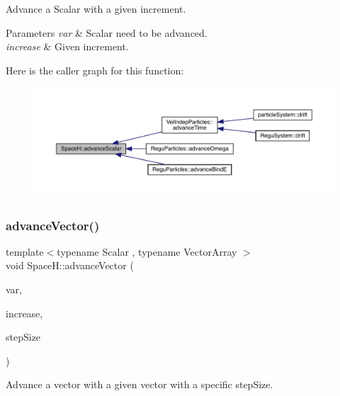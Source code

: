 Advance a Scalar with a given increment. 


\begin{DoxyParams}{Parameters}
{\em var} & Scalar need to be advanced. \\
\hline
{\em increase} & Given increment. \\
\hline
\end{DoxyParams}
Here is the caller graph for this function\+:\nopagebreak
\begin{figure}[H]
\begin{center}
\leavevmode
\includegraphics[width=350pt]{namespace_space_h_a15f1fd0977da382828652627f5dbcdb9_icgraph}
\end{center}
\end{figure}
\mbox{\label{namespace_space_h_a9f1a1d6fedf93c0324cc5993a5694e96}} 
\subsubsection{\texorpdfstring{advance\+Vector()}{advanceVector()}}
{\footnotesize\ttfamily template$<$typename Scalar , typename Vector\+Array $>$ \\
void Space\+H\+::advance\+Vector (\begin{DoxyParamCaption}\item[{Vector\+Array \&}]{var,  }\item[{const Vector\+Array \&}]{increase,  }\item[{\mbox{\hyperlink{create_kepler_8cpp_a8c2981f3f834be9448a6ab06c28748eb}{Scalar}}}]{step\+Size }\end{DoxyParamCaption})\hspace{0.3cm}{\ttfamily [inline]}}



Advance a vector with a given vector with a specific step\+Size. 


